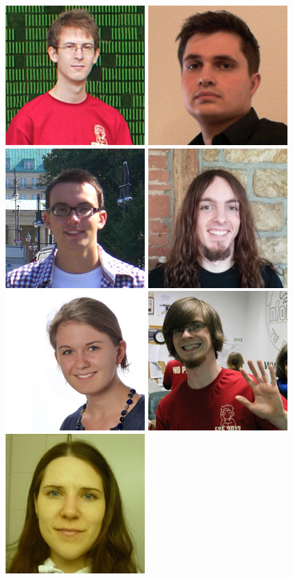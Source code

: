 \includegraphics[width=.2\linewidth]{img/fsr/200_sebastian_mielke.png}
\includegraphics[width=.2\linewidth]{img/fsr/200_rico_skultety.jpg}
\includegraphics[width=.2\linewidth]{img/fsr/200_niklas_fallik.jpg}
\includegraphics[width=.2\linewidth]{img/fsr/200_ben_kosmann.jpg}
\includegraphics[width=.2\linewidth]{img/fsr/200_katja_linnemann.jpg}
\includegraphics[width=.2\linewidth]{img/fsr/200_marc_satkowski.jpg}
\includegraphics[width=.2\linewidth]{img/fsr/200_anita_gruetzner.jpg}

